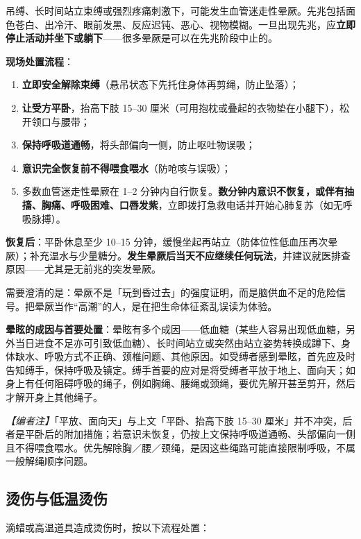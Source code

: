 \documentclass[12pt,UTF8]{ctexbook}
\begin{document}
吊缚、长时间站立束缚或强烈疼痛刺激下，可能发生血管迷走性晕厥。先兆包括面色苍白、出冷汗、眼前发黑、反应迟钝、恶心、视物模糊。一旦出现先兆，应\textbf{立即停止活动并坐下或躺下}——很多晕厥是可以在先兆阶段中止的。

\textbf{现场处置流程}：

\begin{enumerate}
\item \textbf{立即安全解除束缚}（悬吊状态下先托住身体再剪绳，防止坠落）；
\item \textbf{让受方平卧}，抬高下肢 15--30 厘米（可用抱枕或叠起的衣物垫在小腿下），松开领口与腰带；
\item \textbf{保持呼吸道通畅}，将头部偏向一侧，防止呕吐物误吸；
\item \textbf{意识完全恢复前不得喂食喂水}（防呛咳与误吸）；
\item 多数血管迷走性晕厥在 1--2 分钟内自行恢复。\textbf{数分钟内意识不恢复，或伴有抽搐、胸痛、呼吸困难、口唇发紫}，立即拨打急救电话并开始心肺复苏（如无呼吸脉搏）。
\end{enumerate}

\textbf{恢复后}：平卧休息至少 10--15 分钟，缓慢坐起再站立（防体位性低血压再次晕厥）；补充温水与少量糖分。\textbf{发生晕厥后当天不应继续任何玩法}，并建议就医排查原因——尤其是无前兆的突发晕厥。

需要澄清的是：晕厥不是「玩到昏过去」的强度证明，而是脑供血不足的危险信号。把晕厥当作“高潮”的人，是在把生命体征紊乱误读为体验。

\textbf{晕眩的成因与首要处置}：晕眩有多个成因——低血糖（某些人容易出现低血糖，另外当日进食不足亦可引致低血糖）、长时间站立或突然由站立姿势转换成蹲下、身体缺水、呼吸方式不正确、颈椎问题、其他原因。如受缚者感到晕眩，首先应及时告知缚手，保持呼吸及镇定。缚手首要的应对是将受缚者平放于地上、面向天；如身上有任何阻碍呼吸的绳子，例如胸绳、腰绳或颈绳，要优先解开甚至剪开，然后才解开身上其他绳子。

\noindent\textit{【编者注】}「平放、面向天」与上文「平卧、抬高下肢 15--30 厘米」并不冲突，后者是平卧后的附加措施；若意识未恢复，仍按上文保持呼吸道通畅、头部偏向一侧且不得喂食喂水。优先解除胸／腰／颈绳，是因这些绳路可能直接限制呼吸，不属一般解绳顺序问题。

\subsection{烫伤与低温烫伤}

滴蜡或高温道具造成烫伤时，按以下流程处置：
\end{document}
